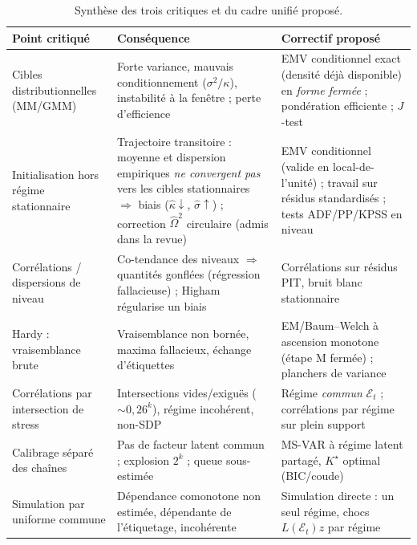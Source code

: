 \documentclass[11pt,a4paper]{article}
\theoremstyle{definition}
\newcommand{\Ecal}{\mathcal{E}}
\begin{document}
\begin{table}[h]
\centering\small
\renewcommand{\arraystretch}{1.4}
\setlength{\tabcolsep}{5pt}
\begin{tabularx}{\textwidth}{>{\raggedright\arraybackslash}p{3.5cm}|X|X}
\toprule
\textbf{Point critiqué} & \textbf{Conséquence} & \textbf{Correctif proposé} \\
\midrule
\rowcolor{nxlightblue} Cibles distributionnelles (MM/GMM) &
Forte variance, mauvais conditionnement ($\sigma^2/\kappa$), instabilité à la fenêtre ; perte d'efficience &
EMV conditionnel exact (densité déjà disponible) en \emph{forme fermée} ; pondération efficiente ; $J$-test \\
\rowcolor{nxoffwhite} Initialisation hors régime stationnaire &
Trajectoire transitoire : moyenne et dispersion empiriques \emph{ne convergent pas} vers les cibles stationnaires $\Rightarrow$ biais ($\hat\kappa\!\downarrow$, $\hat\sigma\!\uparrow$) ; correction $\widehat\Omega^2$ circulaire (admis dans la revue) &
EMV conditionnel (valide en local-de-l'unité) ; travail sur résidus standardisés ; tests ADF/PP/KPSS en niveau \\
\rowcolor{nxlightblue} Corrélations / dispersions de niveau &
Co-tendance des niveaux $\Rightarrow$ quantités gonflées (régression fallacieuse) ; Higham régularise un biais &
Corrélations sur résidus PIT, bruit blanc stationnaire \\
\rowcolor{nxoffwhite} Hardy : vraisemblance brute &
Vraisemblance non bornée, maxima fallacieux, échange d'étiquettes &
EM/Baum--Welch à ascension monotone (étape M fermée) ; planchers de variance \\
\rowcolor{nxlightblue} Corrélations par intersection de stress &
Intersections vides/exiguës ($\sim 0{,}26^k$), régime incohérent, non-SDP &
Régime \emph{commun} $\Ecal_t$ ; corrélations par régime sur plein support \\
\rowcolor{nxoffwhite} Calibrage séparé des chaînes &
Pas de facteur latent commun ; explosion $2^k$ ; queue sous-estimée &
MS-VAR à régime latent partagé, $K^\star$ optimal (BIC/coude) \\
\rowcolor{nxlightblue} Simulation par uniforme commune &
Dépendance comonotone non estimée, dépendante de l'étiquetage, incohérente &
Simulation directe : un seul régime, chocs $L(\Ecal_t)z$ par régime \\
\bottomrule
\end{tabularx}
\caption{Synthèse des trois critiques et du cadre unifié proposé.}
\label{tab:synth}
\end{table}
\end{document}
